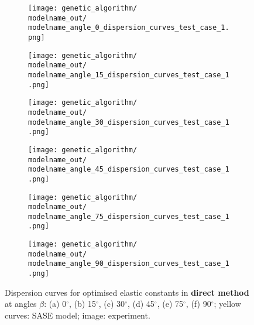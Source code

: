 \documentclass[preprint,12pt]{elsarticle}
\begin{document}
\begin{figure} [h!]
	\newcommand{\modelname}{ga_plain_weave_C_tensor_known_mass}
	\centering
	\begin{subfigure}[b]{0.49\textwidth}
		\centering
		\texttt{[image: genetic\_algorithm/\\modelname\_out/\\modelname\_angle\_0\_dispersion\_curves\_test\_case\_1.png]}
		\caption{}
		\label{fig:dispersion0deg_direct}
	\end{subfigure}
	\begin{subfigure}[b]{0.49\textwidth}
		\centering
		\texttt{[image: genetic\_algorithm/\\modelname\_out/\\modelname\_angle\_15\_dispersion\_curves\_test\_case\_1.png]}
		\caption{}
		\label{fig:dispersion15deg_direct}
	\end{subfigure}
	\begin{subfigure}[b]{0.49\textwidth}
		\centering
		\texttt{[image: genetic\_algorithm/\\modelname\_out/\\modelname\_angle\_30\_dispersion\_curves\_test\_case\_1.png]}
		\caption{}
		\label{fig:dispersion30deg_direct}
	\end{subfigure}
	\begin{subfigure}[b]{0.49\textwidth}
		\centering
		\texttt{[image: genetic\_algorithm/\\modelname\_out/\\modelname\_angle\_45\_dispersion\_curves\_test\_case\_1.png]}
		\caption{}
		\label{fig:dispersion45deg_direct}
	\end{subfigure}
	\begin{subfigure}[b]{0.49\textwidth}
		\centering
		\texttt{[image: genetic\_algorithm/\\modelname\_out/\\modelname\_angle\_75\_dispersion\_curves\_test\_case\_1.png]}
		\caption{}
		\label{fig:dispersion75deg_direct}
	\end{subfigure}
	\begin{subfigure}[b]{0.49\textwidth}
		\centering
		\texttt{[image: genetic\_algorithm/\\modelname\_out/\\modelname\_angle\_90\_dispersion\_curves\_test\_case\_1.png]}
		\caption{}
		\label{fig:dispersion90deg_direct}
	\end{subfigure}
	\caption{Dispersion curves for optimised elastic constants in \textbf{direct method} at angles $\beta$: (a) 0$^{\circ}$, (b) 15$^{\circ}$, (c) 30$^{\circ}$, (d) 45$^{\circ}$, (e) 75$^{\circ}$, (f) 90$^{\circ}$; yellow curves: SASE model; image: experiment. }
	\label{fig:optimized_direct}
\end{figure}

\clearpage
\end{document}
